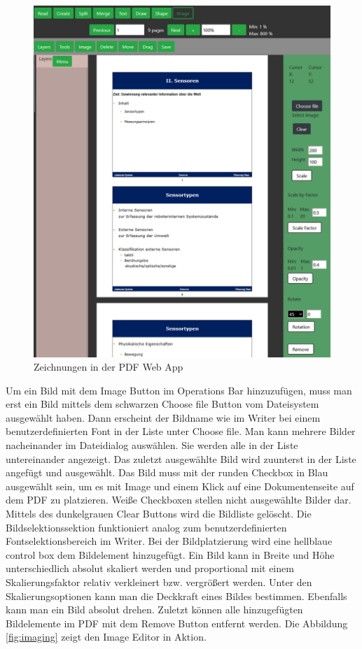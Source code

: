 \begin{figure}[!htbp]
	\centering
	\includegraphics[width=1\textwidth]{"images/images.png"}
	\caption{Zeichnungen in der PDF Web App}
	\label{fig:images}
\end{figure}

Um ein Bild mit dem Image Button im Operations Bar hinzuzufügen, muss man erst ein Bild mittels dem schwarzen Choose file Button vom Dateisystem ausgewählt haben. Dann erscheint der Bildname wie im Writer bei einem benutzerdefinierten Font in der Liste unter Choose file. Man kann mehrere Bilder nacheinander im Dateidialog auswählen. Sie werden alle in der Liste untereinander angezeigt. Das zuletzt ausgewählte Bild wird zuunterst in der Liste angefügt und ausgewählt. Das Bild muss mit der runden Checkbox in Blau ausgewählt sein, um es mit Image und einem Klick auf eine Dokumentenseite auf dem PDF zu platzieren. Weiße Checkboxen stellen nicht ausgewählte Bilder dar. Mittels des dunkelgrauen Clear Buttons wird die Bildliste gelöscht. Die Bildselektionssektion funktioniert analog zum benutzerdefinierten Fontselektionsbereich im Writer. Bei der Bildplatzierung wird eine hellblaue control box dem Bildelement hinzugefügt. Ein Bild kann in Breite und Höhe unterschiedlich absolut skaliert werden und proportional mit einem Skalierungsfaktor relativ verkleinert bzw. vergrößert werden. Unter den Skalierungsoptionen kann man die Deckkraft eines Bildes bestimmen. Ebenfalls kann man ein Bild absolut drehen. Zuletzt können alle hinzugefügten Bildelemente im PDF mit dem Remove Button entfernt werden. Die Abbildung \ref{fig:imaging} zeigt den Image Editor in Aktion.

